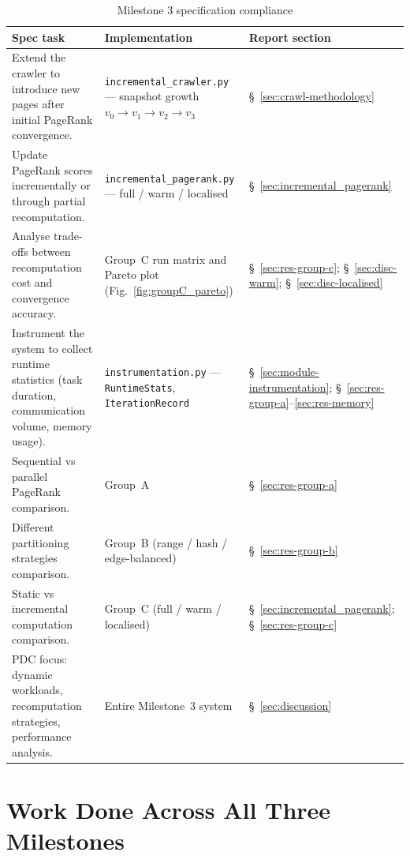 \documentclass[11pt,a4paper]{article}
\begin{document}
\begin{table}[H]
\centering
\caption{Milestone 3 specification compliance}
\label{tab:checklist}
\small
\setlength{\tabcolsep}{5pt}
\renewcommand{\arraystretch}{1.15}
\begin{tabular}{@{}%
    >{\raggedright\arraybackslash}p{}%
    >{\raggedright\arraybackslash}p{}%
    >{\raggedright\arraybackslash}p{}@{}}
\toprule
\textbf{Spec task} &
\textbf{Implementation} &
\textbf{Report section} \\
\midrule
Extend the crawler to introduce new pages after initial PageRank convergence. &
\texttt{incremental\_crawler.py} --- snapshot growth $v_0\to v_1\to v_2 \to v_3$ &
\S~\ref{sec:crawl-methodology} \\
Update PageRank scores incrementally or through partial recomputation. &
\texttt{incremental\_pagerank.py} --- full / warm / localised &
\S~\ref{sec:incremental_pagerank} \\
Analyse trade-offs between recomputation cost and convergence accuracy. &
Group~C run matrix and Pareto plot (Fig.~\ref{fig:groupC_pareto}) &
\S~\ref{sec:res-group-c}; \S~\ref{sec:disc-warm}; \S~\ref{sec:disc-localised} \\
Instrument the system to collect runtime statistics (task duration, communication volume, memory usage). &
\texttt{instrumentation.py} --- \texttt{RuntimeStats}, \texttt{IterationRecord} &
\S~\ref{sec:module-instrumentation}; \S~\ref{sec:res-group-a}--\ref{sec:res-memory} \\
Sequential vs parallel PageRank comparison. &
Group~A &
\S~\ref{sec:res-group-a} \\
Different partitioning strategies comparison. &
Group~B (range / hash / edge-balanced) &
\S~\ref{sec:res-group-b} \\
Static vs incremental computation comparison. &
Group~C (full / warm / localised) &
\S~\ref{sec:incremental_pagerank}; \S~\ref{sec:res-group-c} \\
PDC focus: dynamic workloads, recomputation strategies, performance analysis. &
Entire Milestone~3 system &
\S~\ref{sec:discussion} \\
\bottomrule
\end{tabular}
\end{table}

\section{Work Done Across All Three Milestones}
\end{document}
